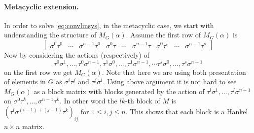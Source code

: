 \paragraph{Metacyclic extension.}

In order to solve \eqref{eq:convlinsys}, in the metacyclic case, we start with understanding the structure of $M_G(\alpha)$. 
Assume the first row of $M_G(\alpha)$ is 
$$\begin{bmatrix}
\sigma^0 \tau^0 &  \cdots & \sigma^{n-1} \tau^0 & \sigma^0 \tau &  \cdots & \sigma^{n-1} \tau & \sigma^0 \tau^s &  \cdots & 
\sigma^{n-1} \tau^s 
\end{bmatrix}$$
Now by considering the actions (respectively) of
$$\tau^0 \sigma^1, \ldots , \tau^0 \sigma^{n-1}, \tau^1 \sigma^0, \ldots , \tau^1 \sigma^{n-1} , \cdots \tau^s \sigma^0, \ldots 
, \tau^s \sigma^{n-1}$$
on the first row we get $M_G(\alpha)$.
Note that here we are using both presentation of elements in $G$ as $\sigma^i\tau^j$ and $\tau^j\sigma^i$. Using above argument 
it is not hard to see $M_G(\alpha)$ as a block matrix with blocks generated by the action of $\tau^l \sigma^1, \ldots , \tau^l 
\sigma^{n-1}$ on $\sigma^0 \tau^k ,  \ldots , \sigma^{n-1} \tau^k$. In other word the $lk$-th block of $M$ is 
$\left( \tau^l \sigma^{(i-1)+(j-1)} \tau^k \right)_{ij}$ for $1 \leq i,j \leq n$. This shows that each block is a Hankel $n \times n$ matrix.



